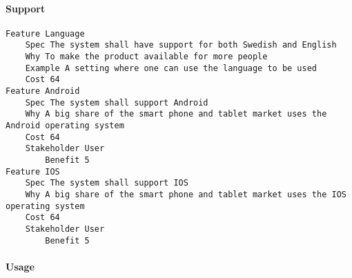 \begin{lstlisting}
\end{lstlisting}
		
				
			 \paragraph{Support}


\begin{lstlisting}
Feature Language
	Spec The system shall have support for both Swedish and English
	Why To make the product available for more people
	Example A setting where one can use the language to be used
	Cost 64
Feature Android
	Spec The system shall support Android
	Why A big share of the smart phone and tablet market uses the Android operating system
	Cost 64
	Stakeholder User
		Benefit 5
Feature IOS
	Spec The system shall support IOS
	Why A big share of the smart phone and tablet market uses the IOS operating system
	Cost 64
	Stakeholder User
		Benefit 5

\end{lstlisting}
		
				
			 \paragraph{Usage}


